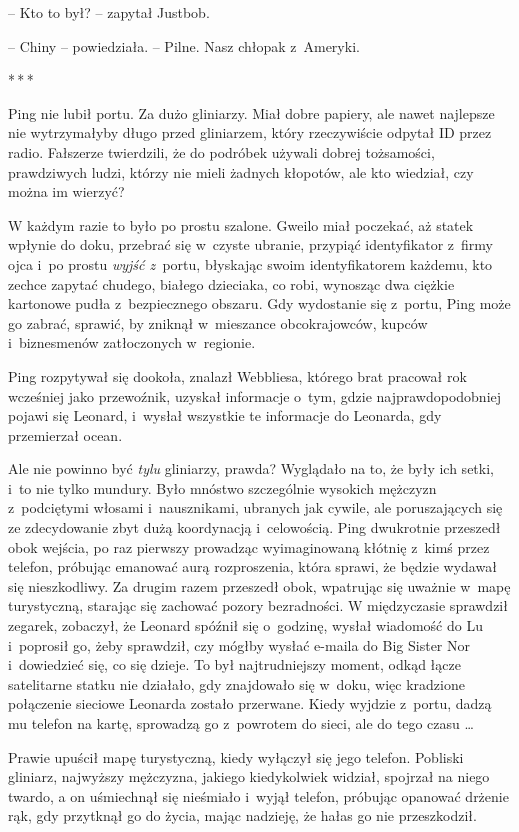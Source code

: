 \documentclass[oneside,polish,11pt,rmheadings]{mwbk}
\newcommand{\threeast}{\par\centerline{*\,*\,*}\medskip\par}
\begin{document}
-- Kto to był? -- zapytał Justbob.

-- Chiny -- powiedziała. -- Pilne. Nasz chłopak z~Ameryki. 

\bigskip
\threeast

Ping nie lubił portu. Za dużo gliniarzy. Miał dobre papiery, ale nawet najlepsze nie wytrzymałyby długo przed gliniarzem, który rzeczywiście odpytał ID przez radio. Fałszerze twierdzili, że do podróbek używali dobrej tożsamości, prawdziwych ludzi, którzy nie mieli żadnych kłopotów, ale kto wiedział, czy można im wierzyć?

W każdym razie to było po prostu szalone. Gweilo miał poczekać, aż statek wpłynie do doku, przebrać się w~czyste ubranie, przypiąć identyfikator z~firmy ojca i~po prostu \textit{wyjść z~}portu, błyskając swoim identyfikatorem każdemu, kto zechce zapytać chudego, białego dzieciaka, co robi, wynosząc dwa ciężkie kartonowe pudła z~bezpiecznego obszaru. Gdy wydostanie się z~portu, Ping może go zabrać, sprawić, by zniknął w~mieszance obcokrajowców, kupców i~biznesmenów zatłoczonych w~regionie.

Ping rozpytywał się dookoła, znalazł Webbliesa, którego brat pracował rok wcześniej jako przewoźnik, uzyskał informacje o~tym, gdzie najprawdopodobniej pojawi się Leonard, i~wysłał wszystkie te informacje do Leonarda, gdy przemierzał ocean.

Ale nie powinno być \textit{tylu }gliniarzy, prawda? Wyglądało na to, że były ich setki, i~to nie tylko mundury. Było mnóstwo szczególnie wysokich mężczyzn z~podciętymi włosami i~nausznikami, ubranych jak cywile, ale poruszających się ze zdecydowanie zbyt dużą koordynacją i~celowością. Ping dwukrotnie przeszedł obok wejścia, po raz pierwszy prowadząc wyimaginowaną kłótnię z~kimś przez telefon, próbując emanować aurą rozproszenia, która sprawi, że będzie wydawał się nieszkodliwy. Za drugim razem przeszedł obok, wpatrując się uważnie w~mapę turystyczną, starając się zachować pozory bezradności. W międzyczasie sprawdził zegarek, zobaczył, że Leonard spóźnił się o~godzinę, wysłał wiadomość do Lu i~poprosił go, żeby sprawdził, czy mógłby wysłać e-maila do Big Sister Nor i~dowiedzieć się, co się dzieje. To był najtrudniejszy moment, odkąd łącze satelitarne statku nie działało, gdy znajdowało się w~doku, więc  kradzione połączenie sieciowe Leonarda zostało przerwane. Kiedy wyjdzie z~portu, dadzą mu telefon na kartę, sprowadzą go z~powrotem do sieci, ale do tego czasu \ldots 

Prawie upuścił mapę turystyczną, kiedy wyłączył się jego telefon. Pobliski gliniarz, najwyższy mężczyzna, jakiego kiedykolwiek widział, spojrzał na niego twardo, a on uśmiechnął się nieśmiało i~wyjął telefon, próbując opanować drżenie rąk, gdy przytknął go do życia, mając nadzieję, że hałas go nie przeszkodził.
\end{document}
